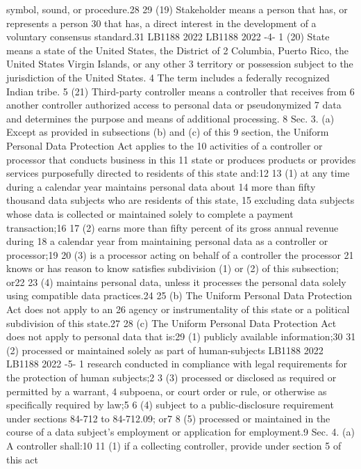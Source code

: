 symbol, sound, or procedure.28
29 (19) Stakeholder means a person that has, or represents a person
30 that has, a direct interest in the development of a voluntary consensus
standard.31
LB1188
2022
LB1188
2022
-4-
1 (20) State means a state of the United States, the District of
2 Columbia, Puerto Rico, the United States Virgin Islands, or any other
3 territory or possession subject to the jurisdiction of the United States.
4 The term includes a federally recognized Indian tribe.
5 (21) Third-party controller means a controller that receives from
6 another controller authorized access to personal data or pseudonymized
7 data and determines the purpose and means of additional processing.
8 Sec. 3. (a) Except as provided in subsections (b) and (c) of this
9 section, the Uniform Personal Data Protection Act applies to the
10 activities of a controller or processor that conducts business in this
11 state or produces products or provides services purposefully directed to
residents of this state and:12
13 (1) at any time during a calendar year maintains personal data about
14 more than fifty thousand data subjects who are residents of this state,
15 excluding data subjects whose data is collected or maintained solely to
complete a payment transaction;16
17 (2) earns more than fifty percent of its gross annual revenue during
18 a calendar year from maintaining personal data as a controller or
processor;19
20 (3) is a processor acting on behalf of a controller the processor
21 knows or has reason to know satisfies subdivision (1) or (2) of this
subsection; or22
23 (4) maintains personal data, unless it processes the personal data
solely using compatible data practices.24
25 (b) The Uniform Personal Data Protection Act does not apply to an
26 agency or instrumentality of this state or a political subdivision of
this state.27
28 (c) The Uniform Personal Data Protection Act does not apply to
personal data that is:29
(1) publicly available information;30
31 (2) processed or maintained solely as part of human-subjects
LB1188
2022
LB1188
2022
-5-
1 research conducted in compliance with legal requirements for the
protection of human subjects;2
3 (3) processed or disclosed as required or permitted by a warrant,
4 subpoena, or court order or rule, or otherwise as specifically required
by law;5
6 (4) subject to a public-disclosure requirement under sections 84-712
to 84-712.09; or7
8 (5) processed or maintained in the course of a data subject's
employment or application for employment.9
Sec. 4. (a) A controller shall:10
11 (1) if a collecting controller, provide under section 5 of this act
